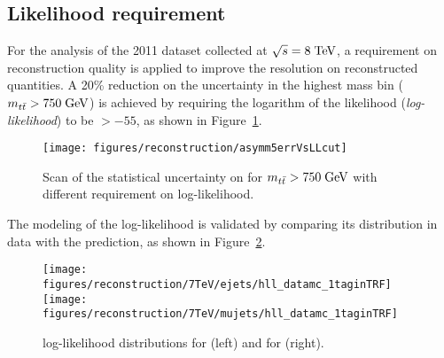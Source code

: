 \subsection{Likelihood requirement}
\label{sec:Reconstruction:lhood}

For the analysis of the 2011 dataset collected at $\sqrt{s} = 8
\; \mathrm{TeV}{}$, a requirement on reconstruction quality is applied to improve
the resolution on reconstructed quantities.
A 20\% reduction on the \ac{} uncertainty in the highest mass bin ($m_{t\bar{t}}{}>750\; \mathrm{GeV}{}$)
is achieved by requiring the logarithm of the likelihood ({\it log-likelihood}) to be $>-55$,
as shown in Figure~\ref{fig:errvsllcut}.

\begin{figure}[!htb]\centering
  \texttt{[image: figures/reconstruction/asymm5errVsLLcut]}
  \caption{
    \label{fig:errvsllcut}
    Scan of the statistical uncertainty on \ac{} for $m_{t\bar{t}}{}>750\; \mathrm{GeV}{}$
    with different requirement on log-likelihood.
  }
\end{figure}

The modeling of the log-likelihood is validated by comparing its
distribution in data with the prediction, as shown in Figure~\ref{fig:logl}.

\begin{figure}[!htb]\centering
  \texttt{[image: figures/reconstruction/7TeV/ejets/hll\_datamc\_1taginTRF]}
  \texttt{[image: figures/reconstruction/7TeV/mujets/hll\_datamc\_1taginTRF]}                                                                            
  \caption{
    \label{fig:logl}
    log-likelihood distributions for \ejets{} (left) and
    for \mujets{} (right).
    }
\end{figure}

